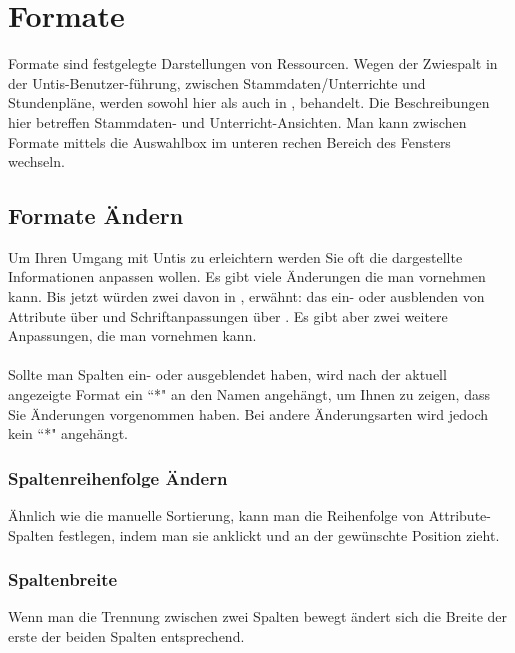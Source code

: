 \section{Formate}
\label{sec:formate-dialog}

Formate sind festgelegte Darstellungen von Ressourcen. Wegen der Zwiespalt in der Untis-Benutzer-führung, zwischen Stammdaten/Unterrichte und Stundenpläne, werden sowohl hier als auch in , behandelt. Die Beschreibungen hier betreffen Stammdaten- und Unterricht-Ansichten. Man kann zwischen Formate mittels die Auswahlbox im unteren rechen Bereich des Fensters wechseln.

\subsection{Formate Ändern}

Um Ihren Umgang mit Untis zu erleichtern werden Sie oft die dargestellte Informationen anpassen wollen. Es gibt viele Änderungen die man vornehmen kann. Bis jetzt würden zwei davon in , erwähnt: das ein- oder ausblenden von Attribute über  und Schriftanpassungen über  . Es gibt aber zwei weitere Anpassungen, die man vornehmen kann.\\
\\
Sollte man Spalten ein- oder ausgeblendet haben, wird nach der aktuell angezeigte Format ein ``*" \hspace{1pt} an den Namen angehängt, um Ihnen zu zeigen, dass Sie Änderungen vorgenommen haben. Bei andere Änderungsarten wird jedoch kein ``*" \hspace{1pt} angehängt.

\subsubsection{Spaltenreihenfolge Ändern}

Ähnlich wie die manuelle Sortierung, kann man die Reihenfolge von Attribute-Spalten festlegen, indem man sie anklickt und an der gewünschte Position zieht.

\subsubsection{Spaltenbreite}
Wenn man die Trennung zwischen zwei Spalten bewegt ändert sich die Breite der erste der beiden Spalten entsprechend.

\newpage

